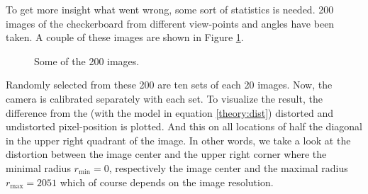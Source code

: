 To get more insight what went wrong, some sort of statistics is needed.
200 images of the checkerboard from different view-points and angles have been taken.
A couple of these images are shown in Figure \ref{development:im}.
\begin{figure}[ht]
	\centering
	
	\caption{Some of the 200 images.\label{development:im}}		
\end{figure}
Randomly selected from these 200 are ten sets of each 20 images.
Now, the camera is calibrated separately with each set.
To visualize the result, the difference from the (with the model in equation \ref{theory:dist}) distorted and undistorted pixel-position is plotted. 
And this on all locations of half the diagonal in the upper right quadrant of the image.
In other words, we take a look at the distortion between the image center and the upper right corner where the minimal radius $r_{\text{min}}=0$, respectively the image center and the maximal radius $r_{\text{max}}=2051$ which of course depends on the image resolution.

